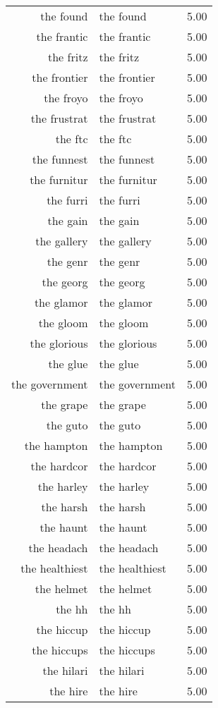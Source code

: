 \begin{table}[ht]
\begin{tabular}{rlr}
  the found & the found & 5.00 \\ 
  the frantic & the frantic & 5.00 \\ 
  the fritz & the fritz & 5.00 \\ 
  the frontier & the frontier & 5.00 \\ 
  the froyo & the froyo & 5.00 \\ 
  the frustrat & the frustrat & 5.00 \\ 
  the ftc & the ftc & 5.00 \\ 
  the funnest & the funnest & 5.00 \\ 
  the furnitur & the furnitur & 5.00 \\ 
  the furri & the furri & 5.00 \\ 
  the gain & the gain & 5.00 \\ 
  the gallery & the gallery & 5.00 \\ 
  the genr & the genr & 5.00 \\ 
  the georg & the georg & 5.00 \\ 
  the glamor & the glamor & 5.00 \\ 
  the gloom & the gloom & 5.00 \\ 
  the glorious & the glorious & 5.00 \\ 
  the glue & the glue & 5.00 \\ 
  the government & the government & 5.00 \\ 
  the grape & the grape & 5.00 \\ 
  the guto & the guto & 5.00 \\ 
  the hampton & the hampton & 5.00 \\ 
  the hardcor & the hardcor & 5.00 \\ 
  the harley & the harley & 5.00 \\ 
  the harsh & the harsh & 5.00 \\ 
  the haunt & the haunt & 5.00 \\ 
  the headach & the headach & 5.00 \\ 
  the healthiest & the healthiest & 5.00 \\ 
  the helmet & the helmet & 5.00 \\ 
  the hh & the hh & 5.00 \\ 
  the hiccup & the hiccup & 5.00 \\ 
  the hiccups & the hiccups & 5.00 \\ 
  the hilari & the hilari & 5.00 \\ 
  the hire & the hire & 5.00 \\ 

\end{tabular}
\end{table}
